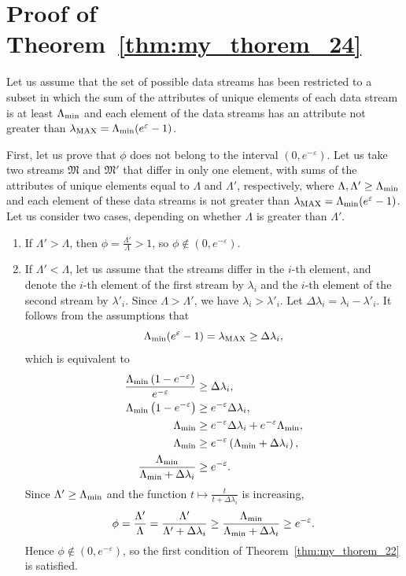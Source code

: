 \chapter{Proof of Theorem~\ref{thm:my_thorem_24}}
\label{appendix:my_theorem_2}

Let us assume that the set of possible data streams has been restricted to a subset in which the sum of the attributes of unique elements of each data stream is at least $\Lambda_{\min}$ and each element of the data streams has an attribute not greater than $\lambda_{\mathrm{MAX}} = \Lambda_{\min}(e^{\varepsilon} - 1)$.

First, let us prove that $\phi$ does not belong to the interval $(0, e^{-\varepsilon})$. Let us take two streams $\mathfrak{M}$ and $\mathfrak{M}'$ that differ in only one element, with sums of the attributes of unique elements equal to $\Lambda$ and $\Lambda'$, respectively, where $\Lambda, \Lambda' \geq \Lambda_{\min}$ and each element of these data streams is not greater than $\lambda_{\mathrm{MAX}} = \Lambda_{\min}(e^{\varepsilon} - 1)$. Let us consider two cases, depending on whether $\Lambda$ is greater than $\Lambda'$.
\begin{enumerate}[label=\arabic*.]
  \item If $\Lambda' > \Lambda$, then $\phi = \frac{\Lambda'}{\Lambda} > 1$, so $\phi \notin (0, e^{-\varepsilon})$.
  \item If $\Lambda' < \Lambda$, let us assume that the streams differ in the $i$-th element, and denote the $i$-th element of the first stream by $\lambda_{i}$ and the $i$-th element of the second stream by $\lambda'_{i}$. Since $\Lambda > \Lambda'$, we have $\lambda_{i} > \lambda'_{i}$. Let $\Delta\lambda_{i} = \lambda_{i} - \lambda'_{i}$. It follows from the assumptions that
  \[
  \Lambda_{\min}(e^{\varepsilon} - 1) = \lambda_{\mathrm{MAX}} \geq \Delta\lambda_{i},
  \]
  which is equivalent to
  \begin{align*}
  \frac{\Lambda_{\min}\left(1 - e^{-\varepsilon}\right)}{e^{-\varepsilon}} &\geq \Delta\lambda_{i}, \\
  \Lambda_{\min}\left(1 - e^{-\varepsilon}\right) &\geq e^{-\varepsilon} \Delta\lambda_{i}, \\
  \Lambda_{\min} &\geq e^{-\varepsilon} \Delta\lambda_{i} + e^{-\varepsilon}\Lambda_{\min}, \\
  \Lambda_{\min} &\geq e^{-\varepsilon}\left(\Lambda_{\min} + \Delta\lambda_{i}\right), \\
  \frac{\Lambda_{\min}}{\Lambda_{\min} + \Delta\lambda_{i}} &\geq e^{-\varepsilon}.
  \end{align*}
  Since $\Lambda' \geq \Lambda_{\min}$ and the function $t \mapsto \frac{t}{t + \Delta\lambda_i}$ is increasing,
  \[
  \phi = \frac{\Lambda'}{\Lambda} = \frac{\Lambda'}{\Lambda' + \Delta\lambda_{i}} \geq \frac{\Lambda_{\min}}{\Lambda_{\min} + \Delta\lambda_{i}} \geq e^{-\varepsilon}.
  \]
  Hence $\phi \notin (0, e^{-\varepsilon})$, so the first condition of Theorem~\ref{thm:my_thorem_22} is satisfied.
\end{enumerate}

